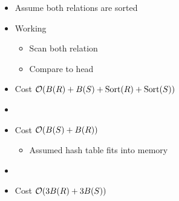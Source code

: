 \begin{itemize}
\begin{itemize}
\begin{itemize}
                    \item Assume both relations are sorted
                    \item Working
                        \begin{itemize}
                            \item Scan both relation
                            \item Compare to head
                        \end{itemize}
                    \item Cost $\mathcal{O}(B(R) + B(S) + \text{Sort}(R) + \text{Sort}(S))$
                \end{itemize}
                \begin{itemize}
                    \item {}
                    \item Cost $\mathcal{O}(B(S) + B(R))$
                        \begin{itemize}
                            \item Assumed hash table fits into memory
                        \end{itemize}
                \end{itemize}
                \begin{itemize}
                    \ipro Deals with the case where the hash table does not fit into memory
                    \item {}
                    \item Cost $\mathcal{O}(3B(R) + 3B(S))$
                \end{itemize}
        \end{itemize}
\end{itemize}
